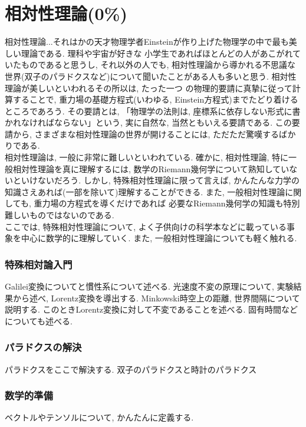 \documentclass[a4j,dvipdfmx]{jsarticle}
\numberwithin{equation}{section}
\begin{document}
    \part{相対性理論(0\%)}
    \begin{screen}
        相対性理論...それはかの天才物理学者Einsteinが作り上げた物理学の中で最も美しい理論である. 理科や宇宙が好きな
        小学生であればほとんどの人があこがれていたものであると思うし, それ以外の人でも, 相対性理論から導かれる不思議な
        世界(双子のパラドクスなど)について聞いたことがある人も多いと思う. 相対性理論が美しいといわれるその所以は, たった一つ
        の物理的要請に真摯に従って計算することで, 重力場の基礎方程式(いわゆる, Einstein方程式)までたどり着けるところであろう. 
        その要請とは, 「物理学の法則は, 座標系に依存しない形式に書かれなければならない」という, 実に自然な, 当然ともいえる要請である.
        この要請から, さまざまな相対性理論の世界が開けることには, ただただ驚嘆するばかりである.\\
        相対性理論は, 一般に非常に難しいといわれている. 確かに, 相対性理論, 特に一般相対性理論を真に理解するには, 数学のRiemann幾何学について熟知していないといけないだろう.
        しかし, 特殊相対性理論に限って言えば, かんたんな力学の知識さえあれば(一部を除いて)理解することができる. また, 一般相対性理論に関しても, 重力場の方程式を導くだけであれば
        必要なRiemann幾何学の知識も特別難しいものではないのである.\\
        ここでは, 特殊相対性理論について, よく子供向けの科学本などに載っている事象を中心に数学的に理解していく.
        また, 一般相対性理論についても軽く触れる.
    \end{screen}
    \clearpage
    \section{特殊相対論入門}
        Galilei変換についてと慣性系について述べる. 光速度不変の原理について, 実験結果から述べ, Lorentz変換を導出する. 
         Minkowski時空上の距離, 世界間隔について説明する. このときLorentz変換に対して不変であることを述べる.
        固有時間などについても述べる.
    \clearpage
    \section{パラドクスの解決}
        パラドクスをここで解決する. 双子のパラドクスと時計のパラドクス
    \clearpage
    \section{数学的準備}
        ベクトルやテンソルについて, かんたんに定義する.
    \clearpage
\end{document}
